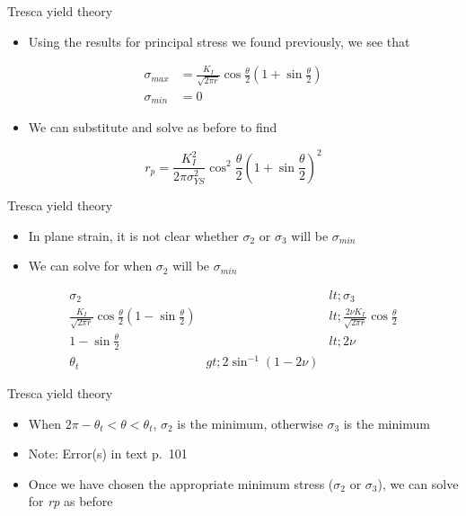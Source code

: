 \documentclass[
  letterpaper,
  ignorenonframetext,
  aspectratio=43,
  handout,
  12pt]{beamer}
\providecommand{\tightlist}{%
  \setlength{\itemsep}{0pt}\setlength{\parskip}{0pt}}
\providecommand{\tightlist}{%
\setlength{\itemsep}{0pt}\setlength{\parskip}{0pt}}
\begin{document}
\begin{frame}{Tresca yield theory}
\protect\hypertarget{tresca-yield-theory-1}{}
\begin{itemize}
\tightlist
\item
  Using the results for principal stress we found previously, we see
  that
\end{itemize}

\[\begin{aligned}
  \sigma_{max} &= \frac{K_I}{\sqrt{2\pi r}}\cos \frac{\theta}{2}\left(1+\sin \frac{\theta}{2}\right)\\
  \sigma_{min} &= 0
\end{aligned}\]

\begin{itemize}
\tightlist
\item
  We can substitute and solve as before to find
\end{itemize}

\[r_p = \frac{K_I^2}{2 \pi \sigma_{YS}^2}\cos^2 \frac{\theta}{2}\left(1+\sin \frac{\theta}{2}\right)^2\]
\end{frame}

\begin{frame}{Tresca yield theory}
\protect\hypertarget{tresca-yield-theory-2}{}
\begin{itemize}
\tightlist
\item
  In plane strain, it is not clear whether \(\sigma_2\) or \(\sigma_3\)
  will be \(\sigma_{min}\)
\item
  We can solve for when \(\sigma_2\) will be \(\sigma_{min}\)
\end{itemize}

\[\begin{aligned}
  \sigma_2 &&lt; \sigma_3\\
  \frac{K_I}{\sqrt{2\pi r}}\cos \frac{\theta}{2}\left(1-\sin \frac{\theta}{2}\right) &&lt; \frac{2\nu K_I}{\sqrt{2\pi r}}\cos \frac{\theta}{2}\\
  1-\sin \frac{\theta}{2} &&lt; 2\nu\\
  \theta_t &gt; 2 \sin^{-1} (1-2\nu)
\end{aligned}\]
\end{frame}

\begin{frame}{Tresca yield theory}
\protect\hypertarget{tresca-yield-theory-3}{}
\begin{itemize}
\tightlist
\item
  When \(2\pi - \theta_t < \theta < \theta_t\), \(\sigma_2\) is the
  minimum, otherwise \(\sigma_3\) is the minimum
\item
  Note: Error(s) in text p.~101
\item
  Once we have chosen the appropriate minimum stress (\(\sigma_2\) or
  \(\sigma_3\)), we can solve for \emph{r}\emph{p} as before
\end{itemize}
\end{frame}
\end{document}
